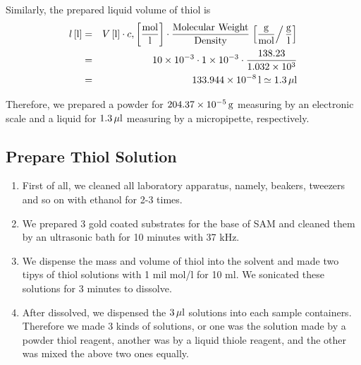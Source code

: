 Similarly, the prepared liquid volume of thiol is
\begin{eqnarray}
 l\, [{\rm l}] &=& V \, [{\rm l}] \cdot c , \left[ \frac{{{\rm mol}}}{\rm l}\right] \cdot 
\frac{\rm Molecular \ Weight}{\rm Density} \left.  \left[ \frac{\rm g}{{\rm mol} }\right/\frac{\rm g}{\rm l}\right] \nonumber \\
& =& 10\times 10^{-3}\cdot 1\times 10^{-3} \cdot  \frac{138.23}{1.032\times 10^{3}} \nonumber \\
&=& 133.944 \times 10^{-8} \, {\rm l} \simeq 1.3 \, \mu \rm l
\end{eqnarray}

Therefore, we prepared a powder for $204.37 \times 10^{-5} \, \rm g$ measuring by an electronic scale and a liquid for $1.3 \, \mu  \rm l$ measuring by a micropipette, respectively.



\subsection{Prepare Thiol Solution}
\begin{enumerate}
 \item First of all, we cleaned all laboratory apparatus, namely, beakers, tweezers and so on with ethanol for 2-3 times.


 \item We prepared 3 gold coated substrates for the base of SAM and cleaned them by an ultrasonic bath for 10 minutes with 37 kHz.
 \item We dispense the mass and volume of thiol into the solvent and made two tipys of thiol solutions with 1 mil mol/l for 10 ml. We sonicated these solutions for 3 minutes to dissolve.
 \item After dissolved, we dispensed the $3 \, \mu \rm l$ solutions into each sample containers. Therefore we made 3 kinds of solutions, or one was the solution made by a powder thiol reagent, another was by a liquid thiole reagent, and the other was mixed the above two ones equally. 
\end{enumerate}

